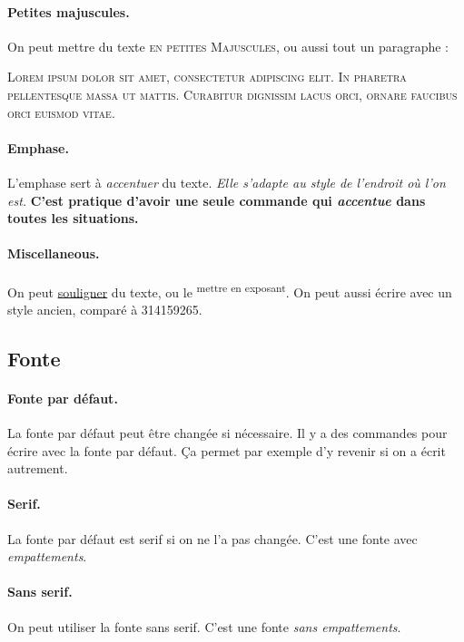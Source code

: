 \documentclass[a4paper, 11pt]{article}
\begin{document}
      \paragraph{Petites majuscules. } On peut mettre du texte \textsc{en petites Majuscules}, ou aussi tout un paragraphe :

      {\scshape Lorem ipsum dolor sit amet, consectetur adipiscing elit. In pharetra pellentesque massa ut mattis. Curabitur dignissim lacus orci, ornare faucibus orci euismod vitae.}

      \paragraph{Emphase. } L'emphase sert à \emph{accentuer} du texte. {\itshape Elle s'adapte au \emph{style} de l'endroit où l'on est.} {\bfseries C'est pratique d'avoir une seule commande qui \emph{accentue} dans toutes les situations.}

      \paragraph{Miscellaneous. } On peut \underline{souligner} du texte, ou le \textsuperscript{mettre en exposant}. On peut aussi écrire  avec un style ancien, comparé à 314159265.

    \subsection{Fonte}

      \paragraph{Fonte par défaut. } La \textnormal{fonte par défaut} peut être changée si nécessaire. {\normalfont Il y a des commandes pour écrire avec la fonte par défaut. Ça permet par exemple d'y revenir si on a écrit autrement.}

      \paragraph{Serif. } La fonte par défaut est \textrm{serif} si on ne l'a pas changée. {\rmfamily C'est une fonte avec \emph{empattements}.}

      \paragraph{Sans serif. } On peut utiliser la fonte \textsf{sans serif}. {\sffamily C'est une fonte \emph{sans empattements}.}
\end{document}
